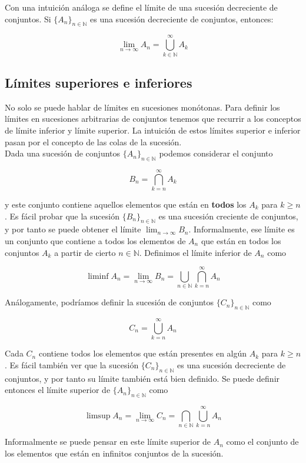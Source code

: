 \documentclass[12pt,a4paper]{book}
\begin{document}
Con una intuición análoga se define el límite de una sucesión decreciente de conjuntos. Si $\{A_n\}_{n\in\mathbb{N}}$ es una sucesión decreciente de conjuntos, entonces:

$$ \lim_{n\to\infty} A_n = \bigcup_{k\in\mathbb{N}}^{\infty} A_k $$

\subsection{Límites superiores e inferiores}

No solo se puede hablar de límites en sucesiones monótonas. Para definir los límites en sucesiones arbitrarias de conjuntos tenemos que recurrir a los conceptos de límite inferior y límite superior. La intuición de estos límites superior e inferior pasan por el concepto de las colas de la sucesión.\\

Dada una sucesión de conjuntos $\{A_n\}_{n\in\mathbb{N} }$ podemos considerar el conjunto

$$ B_n = \bigcap_{k=n}^{\infty} A_k $$ 

y este conjunto contiene aquellos elementos que están en \textbf{todos} los $A_k$ para $k \geq n$. Es fácil probar que la sucesión $\{B_n\}_{n\in\mathbb{N}}$ es una sucesión creciente de conjuntos, y por tanto se puede obtener el límite $\lim_{n\to\infty} B_n$. Informalmente, ese límite es un conjunto que contiene a todos los elementos de $A_n$ que están en todos los conjuntos $A_k$ a partir de cierto $n\in\mathbb{N}$. Definimos el límite inferior de $A_n$ como

$$ \liminf A_n = \lim_{n\to\infty} B_n = \bigcup_{n\in\mathbb{N}} \bigcap_{k=n}^{\infty} A_n $$

Análogamente, podríamos definir la sucesión de conjuntos $\{C_n\}_{n\in\mathbb{N}}$ como

$$ C_n = \bigcup_{k=n}^{\infty} A_n $$

Cada $C_n$ contiene todos los elementos que están presentes en algún $A_k$ para $k \geq n$. Es fácil también ver que la sucesión $\{C_n\}_{n\in\mathbb{N}}$ es una sucesión decreciente de conjuntos, y por tanto su límite también está bien definido. Se puede definir entonces el límite superior de $\{A_n\}_{n\in\mathbb{N}}$ como 

$$ \limsup A_n = \lim_{n\to\infty} C_n = \bigcap_{n\in\mathbb{N}} \bigcup_{k=n}^{\infty} A_n $$

Informalmente se puede pensar en este límite superior de $A_n$ como el conjunto de los elementos que están en infinitos conjuntos de la sucesión.\\
\end{document}
